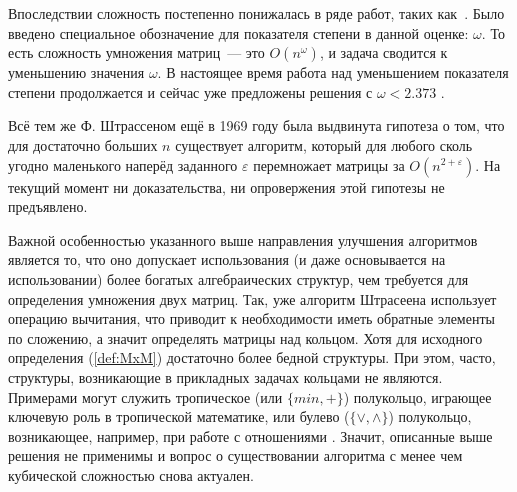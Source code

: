 Впоследствии сложность постепенно понижалась в ряде работ, таких как~\cite{Pan1978,BiniCapoRoma1979,Schonhage1981,CoppWino1982,CoppWino1990}.
Было введено специальное обозначение для показателя степени в данной оценке: $\omega$.
То есть сложность умножения матриц~--- это $O(n^\omega)$, и задача сводится к уменьшению значения $\omega$.
В настоящее время работа над уменьшением показателя степени продолжается и сейчас уже предложены решения с $\omega < 2.373$%
%
.

Всё тем же Ф. Штрассеном ещё в 1969 году была выдвинута гипотеза о том, что для достаточно больших $n$ существует алгоритм, который для любого сколь угодно маленького наперёд заданного $\varepsilon$ перемножает матрицы за $O(n^{2+\varepsilon})$.
На текущий момент ни доказательства, ни опровержения этой гипотезы не предъявлено.

Важной особенностью указанного выше направления улучшения алгоритмов является то, что оно допускает использования (и даже основывается на использовании) более богатых алгебраических структур, чем требуется для определения умножения двух матриц.
Так, уже алгоритм Штрасеена использует операцию вычитания, что приводит к необходимости иметь обратные элементы по сложению, а значит определять матрицы над кольцом.
Хотя для исходного определения (\ref{def:MxM}) достаточно более бедной структуры.
При этом, часто, структуры, возникающие в прикладных задачах кольцами не являются.
Примерами могут служить тропическое (или $\{min, +\}$) полукольцо, играющее ключевую роль в тропической математике, или булево ($\{\lor, \land\}$) полукольцо, возникающее, например, при работе с отношениями%
%
.
Значит, описанные выше решения не применимы и вопрос о существовании алгоритма с менее чем кубической сложностью снова актуален.

